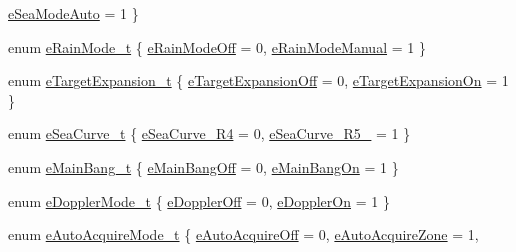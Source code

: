 \begin{DoxyCompactItemize}
\mbox{\hyperlink{namespace_quantum_lib_a66c359df4d1d3895303ab24910200c8da4a8466cfd9643d6fa118b7819f06a34f}{e\+Sea\+Mode\+Auto}} = 1
 \}
\item 
enum \mbox{\hyperlink{namespace_quantum_lib_a881f6940f59e1d22cecd947de841b245}{e\+Rain\+Mode\+\_\+t}} \{ \mbox{\hyperlink{namespace_quantum_lib_a881f6940f59e1d22cecd947de841b245a23d55172337289a683d16dd7c790132f}{e\+Rain\+Mode\+Off}} = 0, 
\mbox{\hyperlink{namespace_quantum_lib_a881f6940f59e1d22cecd947de841b245a23fd258b5a79942f441435c2dbe5543d}{e\+Rain\+Mode\+Manual}} = 1
 \}
\item 
enum \mbox{\hyperlink{namespace_quantum_lib_affbc8bc0775b14917688e0e6d2fab0fb}{e\+Target\+Expansion\+\_\+t}} \{ \mbox{\hyperlink{namespace_quantum_lib_affbc8bc0775b14917688e0e6d2fab0fba08ca29753d9913ebb2d4affbd443984a}{e\+Target\+Expansion\+Off}} = 0, 
\mbox{\hyperlink{namespace_quantum_lib_affbc8bc0775b14917688e0e6d2fab0fba642e93b8e62df601860c5ea46328c0cf}{e\+Target\+Expansion\+On}} = 1
 \}
\item 
enum \mbox{\hyperlink{namespace_quantum_lib_aeaeea421c9323b85e6b45fa78e3b2a06}{e\+Sea\+Curve\+\_\+t}} \{ \mbox{\hyperlink{namespace_quantum_lib_aeaeea421c9323b85e6b45fa78e3b2a06a462a4673778fa74ce2715e58a1ab56d7}{e\+Sea\+Curve\+\_\+\+R4}} = 0, 
\mbox{\hyperlink{namespace_quantum_lib_aeaeea421c9323b85e6b45fa78e3b2a06ab85d01c600b49ab59974c0c47a7ae6ab}{e\+Sea\+Curve\+\_\+\+R5\+\_}} = 1
 \}
\item 
enum \mbox{\hyperlink{namespace_quantum_lib_af78fc1282ff8d85de46fff58a89f5798}{e\+Main\+Bang\+\_\+t}} \{ \mbox{\hyperlink{namespace_quantum_lib_af78fc1282ff8d85de46fff58a89f5798a67acba6e337cfc4e540794b1652dde8c}{e\+Main\+Bang\+Off}} = 0, 
\mbox{\hyperlink{namespace_quantum_lib_af78fc1282ff8d85de46fff58a89f5798aebdc6538b9692b96cb4838b38c2681f9}{e\+Main\+Bang\+On}} = 1
 \}
\item 
enum \mbox{\hyperlink{namespace_quantum_lib_a67a865bb9894671b27595a61dfcd44b5}{e\+Doppler\+Mode\+\_\+t}} \{ \mbox{\hyperlink{namespace_quantum_lib_a67a865bb9894671b27595a61dfcd44b5a1405e885752fc9e27e222762e559a414}{e\+Doppler\+Off}} = 0, 
\mbox{\hyperlink{namespace_quantum_lib_a67a865bb9894671b27595a61dfcd44b5a0d269d3a17442468bad3da1aa57319da}{e\+Doppler\+On}} = 1
 \}
\item 
enum \mbox{\hyperlink{namespace_quantum_lib_ad91dac4bf2ef5d3615cb423383b961d8}{e\+Auto\+Acquire\+Mode\+\_\+t}} \{ \mbox{\hyperlink{namespace_quantum_lib_ad91dac4bf2ef5d3615cb423383b961d8a44c95a0755a6e2b1788ad86f287502e4}{e\+Auto\+Acquire\+Off}} = 0, 
\mbox{\hyperlink{namespace_quantum_lib_ad91dac4bf2ef5d3615cb423383b961d8a3103d96d43f0c8a4c47e6e1a08b96ccd}{e\+Auto\+Acquire\+Zone}} = 1, 

\end{DoxyCompactItemize}
